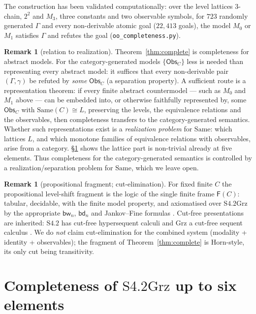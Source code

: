 \documentclass[11pt]{amsart}
\theoremstyle{definition}
\newtheorem{rem}[thm]{Remark}
\newcommand{\Same}{\mathrm{Same}}
\newcommand{\Fr}{\mathsf{F}}
\newcommand{\Obs}{\mathsf{Obs}}
\newcommand{\bw}{\mathsf{bw}}
\newcommand{\bd}{\mathsf{bd}}
\newcommand{\Grz}{\mathrm{Grz}}
\begin{document}
The construction has been validated computationally: over the level lattices
$3$-chain, $2^2$ and $M_3$, three constants and two observable symbols, for
$723$ randomly generated $\Gamma$ and every non-derivable atomic goal ($22{,}413$
goals), the model $M_0$ or $M_1$ satisfies $\Gamma$ and refutes the goal
(\texttt{oo\_completeness.py}).

\begin{rem}[relation to realization]\label{rem:realize}
Theorem~\ref{thm:complete} is completeness for abstract models. For the
category-generated models $\{\Obs_C\}$ less is needed than representing every
abstract model: it suffices that every non-derivable pair $(\Gamma,\gamma)$ be
refuted by \emph{some} $\Obs_C$ (a separation property). A sufficient route is a
representation theorem: if every finite abstract countermodel --- such as $M_0$
and $M_1$ above --- can be embedded into, or otherwise faithfully represented
by, some $\Obs_C$ with $\Same(C)\cong L$, preserving the levels, the equivalence
relations and the observables, then completeness transfers to the
category-generated semantics. Whether such representations exist is a
\emph{realization problem} for $\Same$: which lattices $L$, and which monotone
families of equivalence relations with observables, arise from a category.
\S\ref{sec:complete} shows the lattice part is non-trivial already at five
elements. Thus completeness for the category-generated semantics is controlled
by a realization/separation problem for $\Same$, which we leave open.
\end{rem}

\begin{rem}[propositional fragment; cut-elimination]\label{rem:prop}
For fixed finite $C$ the propositional level-shift fragment is the logic of the
single finite frame $\Fr(C)$: tabular, decidable, with the finite model
property, and axiomatised over $\mathrm{S4.2Grz}$ by the appropriate $\bw_n$,
$\bd_n$ and Jankov--Fine formulas \cite{CZ97}. Cut-free presentations are
inherited: $\mathrm{S4.2}$ has cut-free hypersequent calculi \cite{Lahav13} and
$\Grz$ a cut-free sequent calculus \cite{Avron84}. We do \emph{not} claim
cut-elimination for the combined system (modality + identity + observables);
the fragment of Theorem~\ref{thm:complete} is Horn-style, its only cut being
transitivity.
\end{rem}

\section{Completeness of $\mathrm{S4.2Grz}$ up to six elements}\label{sec:complete}
\end{document}
